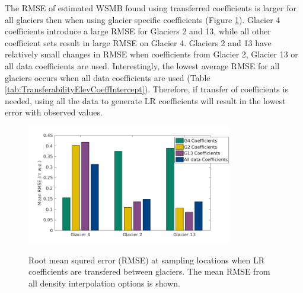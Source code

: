 \documentclass[12pt]{article}
\begin{document}
The RMSE of estimated WSMB found using transferred coefficients is larger for all glaciers then when using glacier specific coefficients (Figure \ref{fig:TransferabilityRMSE}). Glacier 4 coefficients introduce a large RMSE for Glaciers 2 and 13, while all other coefficient sets result in large RMSE on Glacier 4. Glaciers 2 and 13 have relatively small changes in RMSE when coefficients from Glacier 2, Glacier 13 or all data coefficients are used. Interestingly, the lowest average RMSE for all glaciers occurs when all data coefficients are used (Table \ref{tab:TransferabilityElevCoeffIntercept}). Therefore, if transfer of coefficients is needed, using all the data to generate LR coefficients will result in the lowest error with observed values.  



\begin{figure}[H]
	\centering
	\includegraphics[width =0.8\textwidth]{TransferabilityRMSE.png}\\
	\caption{Root mean squred error (RMSE) at sampling locations when LR coefficients are transfered between glaciers. The mean RMSE from all density interpolation options is shown.}
	\label{fig:TransferabilityRMSE}
\end{figure}

\end{document}
